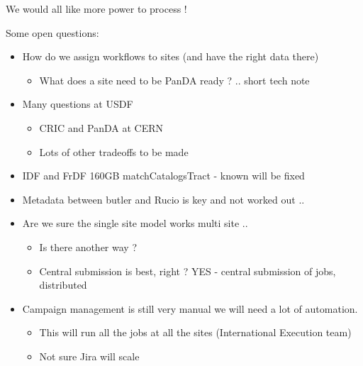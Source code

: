 
We would all like more power to process !

Some open questions:

\begin{itemize}
\item How do we assign workflows to sites (and have the right data there)
\begin{itemize}
\item What does a site need to be PanDA ready ? .. short tech note
\end{itemize}

\item Many questions at USDF
\begin{itemize}
\item CRIC and PanDA at CERN
\item Lots of other tradeoffs to be made
\end{itemize}
\item IDF and FrDF  160GB matchCatalogsTract - known will be fixed
\item Metadata between butler and Rucio is key and not worked out ..
\item Are we sure the single site model works multi site ..
\begin{itemize}
\item Is there another way ?
\item Central submission is best, right ? YES - central submission of jobs, distributed
\end{itemize}
\item Campaign management is still very manual we will need a lot of automation.
\begin{itemize}
\item This will run all the jobs at all the sites (International Execution team)
\item Not sure Jira will scale
\end{itemize}
\end{itemize}


